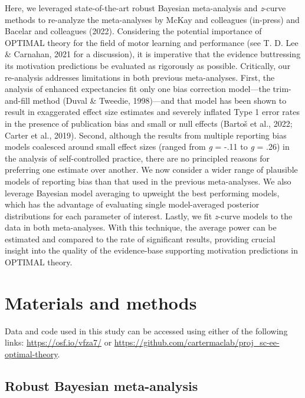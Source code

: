 \documentclass[
  doc, donotrepeattitle,floatsintext]{apa7}
\begin{document}
Here, we leveraged state-of-the-art robust Bayesian meta-analysis and \emph{z}-curve methods to re-analyze the meta-analyses by McKay and colleagues (in-press) and Bacelar and colleagues (2022). Considering the potential importance of OPTIMAL theory for the field of motor learning and performance (see T. D. Lee \& Carnahan, 2021 for a discussion), it is imperative that the evidence buttressing its motivation predictions be evaluated as rigorously as possible. Critically, our re-analysis addresses limitations in both previous meta-analyses. First, the analysis of enhanced expectancies fit only one bias correction model---the trim-and-fill method (Duval \& Tweedie, 1998)---and that model has been shown to result in exaggerated effect size estimates and severely inflated Type 1 error rates in the presence of publication bias and small or null effects (Bartoš et al., 2022; Carter et al., 2019). Second, although the results from multiple reporting bias models coalesced around small effect sizes (ranged from \emph{g} = -.11 to \emph{g} = .26) in the analysis of self-controlled practice, there are no principled reasons for preferring one estimate over another. We now consider a wider range of plausible models of reporting bias than that used in the previous meta-analyses. We also leverage Bayesian model averaging to upweight the best performing models, which has the advantage of evaluating single model-averaged posterior distributions for each parameter of interest. Lastly, we fit \emph{z}-curve models to the data in both meta-analyses. With this technique, the average power can be estimated and compared to the rate of significant results, providing crucial insight into the quality of the evidence-base supporting motivation predictions in OPTIMAL theory.

\hypertarget{materials-and-methods}{%
\section{Materials and methods}\label{materials-and-methods}}

Data and code used in this study can be accessed using either of the following links: \url{https://osf.io/vfza7/} or \url{https://github.com/cartermaclab/proj_sc-ee-optimal-theory}.

\hypertarget{robust-bayesian-meta-analysis}{%
\subsection{Robust Bayesian meta-analysis}\label{robust-bayesian-meta-analysis}}
\end{document}
